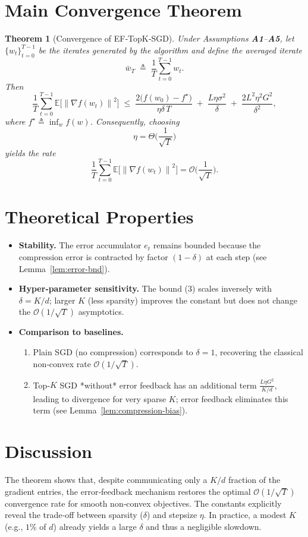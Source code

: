 \documentclass{article}
\newtheorem{theorem}{Theorem}
\newcommand{\E}{\mathbb{E}}
\newcommand{\norm}[1]{\left\|#1\right\|}
\newcommand{\grad}{\nabla}
\begin{document}
\section*{Main Convergence Theorem}
\begin{theorem}[Convergence of EF‑TopK‑SGD]\label{thm:main}
Under Assumptions \textbf{A1}–\textbf{A5}, let $\{w_t\}_{t=0}^{T-1}$ be the iterates generated by the algorithm and define the averaged iterate 
\[
\bar w_T\;\triangleq\;\frac{1}{T}\sum_{t=0}^{T-1} w_t .
\]
Then
\[
\frac{1}{T}\sum_{t=0}^{T-1}\E\!\big[\norm{\grad f(w_t)}^{2}\big]
\;\le\;
\frac{2\big(f(w_0)-f^{\star}\big)}{\eta\delta\,T}
\;+\;
\frac{L\eta\sigma^{2}}{\delta}
\;+\;
\frac{2L^{2}\eta^{2}G^{2}}{\delta^{2}},
\tag{3}
\]
where $f^{\star}\triangleq\inf_{w}f(w)$. Consequently, choosing
\[
\eta = \Theta\!\bigg(\frac{1}{\sqrt{T}}\bigg)
\]
yields the rate
\[
\frac{1}{T}\sum_{t=0}^{T-1}\E\!\big[\norm{\grad f(w_t)}^{2}\big]=\mathcal O\!\bigg(\frac{1}{\sqrt{T}}\bigg).
\]
\end{theorem}

\section*{Theoretical Properties}
\begin{itemize}
\item \textbf{Stability.} The error accumulator $e_t$ remains bounded because the compression error is contracted by factor $(1-\delta)$ at each step (see Lemma~\ref{lem:error-bnd}).
\item \textbf{Hyper‑parameter sensitivity.} The bound (3) scales inversely with $\delta=K/d$; larger $K$ (less sparsity) improves the constant but does not change the $\mathcal O(1/\sqrt{T})$ asymptotics.
\item \textbf{Comparison to baselines.}
    \begin{enumerate}[label=\roman*)]
    \item Plain SGD (no compression) corresponds to $\delta=1$, recovering the classical non‑convex rate $\mathcal O(1/\sqrt{T})$.
    \item Top‑$K$ SGD *without* error feedback has an additional term $\frac{L\eta G^{2}}{K/d}$, leading to divergence for very sparse $K$; error feedback eliminates this term (see Lemma~\ref{lem:compression-bias}).
    \end{enumerate}
\end{itemize}

\section*{Discussion}
The theorem shows that, despite communicating only a $K/d$ fraction of the gradient entries, the error‑feedback mechanism restores the optimal $\mathcal O(1/\sqrt{T})$ convergence rate for smooth non‑convex objectives. The constants explicitly reveal the trade‑off between sparsity ($\delta$) and stepsize $\eta$. In practice, a modest $K$ (e.g., $1\%$ of $d$) already yields a large $\delta$ and thus a negligible slowdown.
\end{document}
